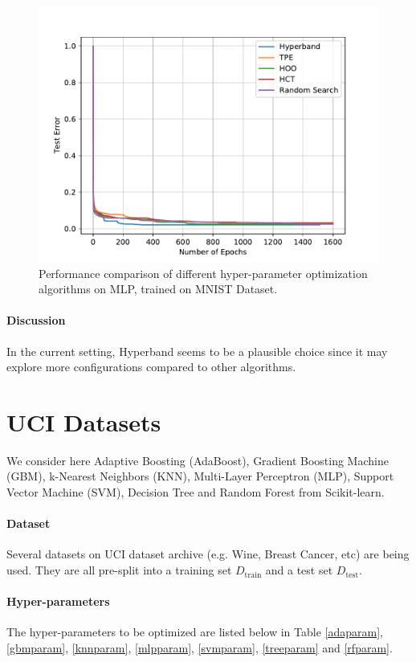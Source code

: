 \documentclass[runningheads,a4paper]{llncs}
\begin{document}
\begin{figure}[ht]
    \centering
    \includegraphics[scale=0.8]{img/mnist/mlp_0.pdf}
    \caption{Performance comparison of different hyper-parameter optimization algorithms on MLP, trained on MNIST Dataset.}
    \label{mlp_0}
\end{figure}

\paragraph{\textbf{Discussion}} In the current setting, Hyperband seems to be a plausible choice since it may explore more configurations compared to other algorithms.


\section{UCI Datasets}

We consider here Adaptive Boosting (AdaBoost), Gradient Boosting Machine (GBM), k-Nearest Neighbors (KNN), Multi-Layer Perceptron (MLP), Support Vector Machine (SVM), Decision Tree and Random Forest from Scikit-learn.

\paragraph{\textbf{Dataset}} Several datasets on UCI dataset archive (e.g. Wine, Breast Cancer, etc) are being used. They are all pre-split into a training set $D_{\operatorname{train}}$ and a test set $D_{\operatorname{test}}$.

\paragraph{\textbf{Hyper-parameters}} The hyper-parameters to be optimized are listed below in Table \ref{adaparam}, \ref{gbmparam},  \ref{knnparam}, \ref{mlpparam}, \ref{svmparam}, \ref{treeparam} and \ref{rfparam}.
\end{document}
